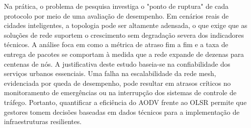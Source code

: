 \documentclass[12pt]{article}
\begin{document}
Na prática, o problema de pesquisa investiga o "ponto de ruptura" de cada protocolo por meio de uma avaliação de desempenho. Em cenários reais de cidades inteligentes, a topologia pode ser altamente adensada, o que exige que as soluções de rede suportem o crescimento sem degradação severa dos indicadores técnicos. A análise foca em como a métrica de atraso fim a fim e a taxa de entrega de pacotes se comportam à medida que a rede expande de dezenas para centenas de nós. A justificativa deste estudo baseia-se na confiabilidade dos serviços urbanos essenciais. Uma falha na escalabilidade da rede mesh, evidenciada por queda de desempenho, pode resultar em atrasos críticos no monitoramento de emergências ou na interrupção dos sistemas de controle de tráfego. Portanto, quantificar a eficiência do AODV frente ao OLSR permite que gestores tomem decisões baseadas em dados técnicos para a implementação de infraestruturas resilientes.




\end{document}
